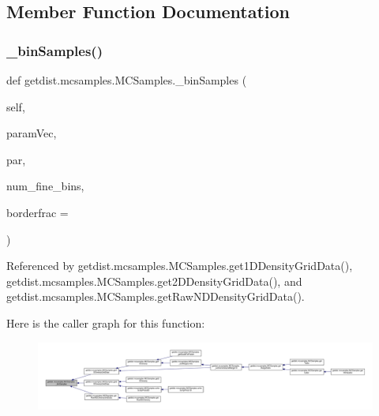 \subsection{Member Function Documentation}
\mbox{\label{classgetdist_1_1mcsamples_1_1MCSamples_a857a2912d26818c22998c9480ffb4019}} 
\subsubsection{\texorpdfstring{\+\_\+bin\+Samples()}{\_binSamples()}}
{\footnotesize\ttfamily def getdist.\+mcsamples.\+M\+C\+Samples.\+\_\+bin\+Samples (\begin{DoxyParamCaption}\item[{}]{self,  }\item[{}]{param\+Vec,  }\item[{}]{par,  }\item[{}]{num\+\_\+fine\+\_\+bins,  }\item[{}]{borderfrac = {} }\end{DoxyParamCaption})\hspace{0.3cm}{\ttfamily [private]}}



Referenced by getdist.\+mcsamples.\+M\+C\+Samples.\+get1\+D\+Density\+Grid\+Data(), getdist.\+mcsamples.\+M\+C\+Samples.\+get2\+D\+Density\+Grid\+Data(), and getdist.\+mcsamples.\+M\+C\+Samples.\+get\+Raw\+N\+D\+Density\+Grid\+Data().

Here is the caller graph for this function\+:
\nopagebreak
\begin{figure}[H]
\begin{center}
\leavevmode
\includegraphics[width=350pt]{classgetdist_1_1mcsamples_1_1MCSamples_a857a2912d26818c22998c9480ffb4019_icgraph}
\end{center}
\end{figure}
\mbox{\label{classgetdist_1_1mcsamples_1_1MCSamples_a467ece66c344e1e7d4e68f44ea0812f1}} 
